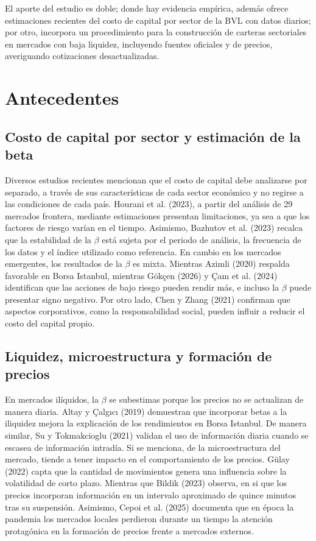 \documentclass[jrfm,article,submit,oneauthor]{Definitions/mdpi}
\begin{document}
El aporte del estudio es doble; donde hay evidencia empírica, además ofrece estimaciones recientes del costo de capital por sector de la BVL con datos diarios; por otro, incorpora un procedimiento para la construcción de carteras sectoriales en mercados con baja liquidez, incluyendo fuentes oficiales y de precios, averiguando cotizaciones desactualizadas. 

\section{Antecedentes}
\subsection{Costo de capital por sector y estimación de la beta}
Diversos estudios recientes mencionan que el costo de capital debe analizarse por separado, a través de sus características de cada sector económico y no regirse a las condiciones de cada país. Hourani et al. (2023), a partir del análisis de 29 mercados frontera, mediante estimaciones presentan limitaciones, ya sea a que los factores de riesgo varían en el tiempo. Asimismo, Bazhutov et al. (2023) recalca que la estabilidad de la $\beta$ está sujeta por el periodo de análisis, la frecuencia de los datos y el índice utilizado como referencia. En cambio en los mercados emergentes, los resultados de la $\beta$ es mixta. Mientras Azimli (2020) respalda favorable en Borsa Istanbul, mientras Gökçen (2026) y Çam et al. (2024) identifican que las acciones de bajo riesgo pueden rendir más, e incluso la $\beta$  puede presentar signo negativo. Por otro lado, Chen y Zhang (2021) confirman que aspectos corporativos, como la responsabilidad social, pueden influir a reducir el costo del capital propio.

\subsection{Liquidez, microestructura y formación de precios}
En mercados ilíquidos, la $\beta$ se subestimas porque los precios no se actualizan de manera diaria. Altay y Çalgıcı (2019) demuestran que incorporar betas a la iliquidez mejora la explicación de los rendimientos en Borsa Istanbul. De manera similar, Su y Tokmakcioglu (2021) validan el uso de información diaria cuando se escasea de información intradía. Si se menciona, de la microestructura del mercado, tiende a tener impacto en el comportamiento de los precios. Gülay (2022) capta que la cantidad de movimientos genera una influencia sobre la volatilidad de corto plazo. Mientras que Bildik (2023) observa, en si que los precios incorporan información en un intervalo aproximado de quince minutos tras su suspensión. Asimismo, Cepoi et al. (2025) documenta que en época la pandemia los mercados locales perdieron durante un tiempo la atención protagónica en la formación de precios frente a mercados externos.
\end{document}

